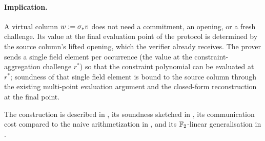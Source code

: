 \paragraph{Implication.} A virtual column $w := \sigma_* v$ does not
need a commitment, an opening, or a fresh challenge. Its value at the
final evaluation point of the protocol is determined by the source
column's lifted opening, which the verifier already receives. The
prover sends a single field element per occurrence (the value at the
constraint-aggregation challenge $r^*$) so that the constraint
polynomial can be evaluated at $r^*$; soundness of that single field
element is bound to the source column through the existing
multi-point evaluation argument and the closed-form reconstruction at
the final point.

The construction is described in
, its soundness
sketched in , its communication cost compared to
the naive arithmetization in , and its $\mathbb{F}_2$-linear
generalisation in .
